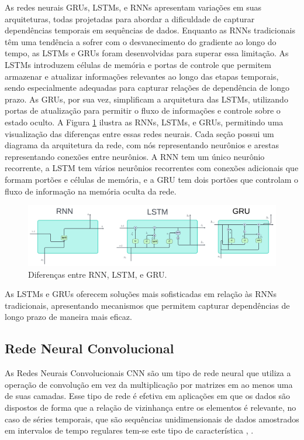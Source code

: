  As redes neurais GRUs, LSTMs, e RNNs apresentam variações em suas arquiteturas, todas projetadas para abordar a dificuldade de capturar dependências temporais em sequências de dados. Enquanto as RNNs tradicionais têm uma tendência a sofrer com o desvanecimento do gradiente ao longo do tempo, as LSTMs e GRUs foram desenvolvidas para superar essa limitação. As LSTMs introduzem células de memória e portas de controle que permitem armazenar e atualizar informações relevantes ao longo das etapas temporais, sendo especialmente adequadas para capturar relações de dependência de longo prazo. As GRUs, por sua vez, simplificam a arquitetura das LSTMs, utilizando portas de atualização para permitir o fluxo de informações e controle sobre o estado oculto.
 A Figura \ref{fig:rnn-vs-lstm-vs-gru-1024x308} ilustra as RNNs, LSTMs, e GRUs, permitindo uma visualização das diferenças entre essas redes neurais. Cada seção possui um diagrama da arquitetura da rede, com nós representando neurônios e arestas representando conexões entre neurônios. A RNN tem um único neurônio recorrente, a LSTM tem vários neurônios recorrentes com conexões adicionais que formam portões e células de memória, e a GRU tem dois portões que controlam o fluxo de informação na memória oculta da rede. 
 
 \begin{figure}[!htb]
 	\centering
 	\caption{Diferenças entre RNN, LSTM, e GRU.}
 	\label{fig:rnn-vs-lstm-vs-gru-1024x308}
 	\includegraphics[width=\linewidth]{Modelos/Figuras/RNN-vs-LSTM-vs-GRU-1024x308.pdf}
 \end{figure}
 
  As LSTMs e GRUs oferecem soluções mais sofisticadas em relação às RNNs tradicionais, apresentando mecanismos que permitem capturar dependências de longo prazo de maneira mais eficaz.
 
 \subsection{Rede Neural Convolucional}
 
As Redes Neurais Convolucionais CNN são um tipo de rede neural que utiliza a operação de convolução em vez da multiplicação por matrizes em ao menos uma de suas camadas. Esse tipo de rede é efetiva em aplicações em que os dados são dispostos de forma que a relação de vizinhança entre os elementos é relevante, no caso de séries temporais, que são sequências unidimensionais de dados amostrados em intervalos de tempo regulares tem-se este tipo de característica \cite{silva_2021}, \cite{7533055} .
 
